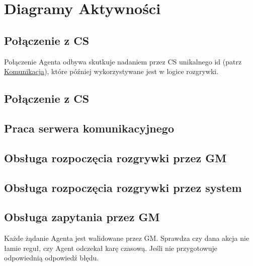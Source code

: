 \documentclass[../Dokumentacja.tex]{subfiles}
\begin{document}
\section{Diagramy Aktywności}
\subsection{Połączenie z CS}
Połączenie Agenta odbywa skutkuje nadaniem przez CS unikalnego id (patrz \hyperref[sec:komunikacja]{Komunikacja}),
które później wykorzystywane jest w logice rozgrywki.

\begin{landscape}
    \subsection{Połączenie z CS}
\end{landscape}

\subsection{Praca serwera komunikacyjnego}

\subsection{Obsługa rozpoczęcia rozgrywki przez GM}

\begin{landscape}
    \subsection{Obsługa rozpoczęcia rozgrywki przez system}
\end{landscape}

\subsection{Obsługa zapytania przez GM}
Każde żądanie Agenta jest walidowane przez GM. Sprawdza czy dana akcja nie łamie reguł, czy Agent odczekał karę czasową. Jeśli nie
przygotowuje odpowiednią odpowiedź błędu.
\end{document}
